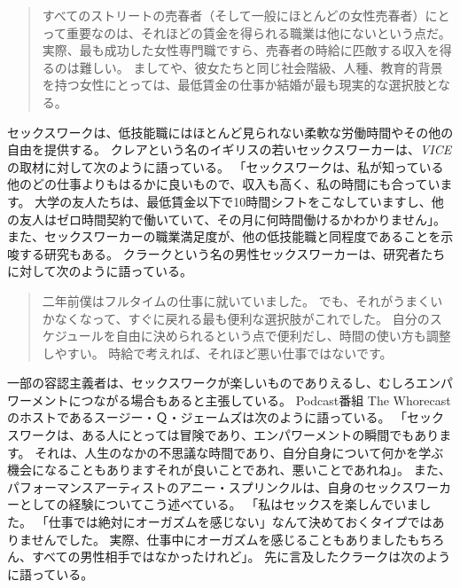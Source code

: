 \documentclass[paper=a4,book,openany]{jlreq} \usepackage{mystyle}
\begin{document}
\begin{quote}
すべてのストリートの売春者（そして一般にほとんどの女性売春者）にとって重要なのは、それほどの賃金を得られる職業は他にないという点だ。
実際、最も成功した女性専門職ですら、売春者の時給に匹敵する収入を得るのは難しい。
ましてや、彼女たちと同じ社会階級、人種、教育的背景を持つ女性にとっては、最低賃金の仕事か結婚が最も現実的な選択肢となる。
\citep[p.104]{bernstein99:_whats_wrong_prost}
\end{quote}

セックスワークは、低技能職にはほとんど見られない柔軟な労働時間やその他の自由を提供する。
クレアという名のイギリスの若いセックスワーカーは、\emph{VICE}の取材に対して次のように語っている。
「セックスワークは、私が知っている他のどの仕事よりもはるかに良いもので、収入も高く、私の時間にも合っています。
大学の友人たちは、最低賃金以下で10時間シフトをこなしていますし、他の友人はゼロ時間契約で働いていて、その月に何時間働けるかわかりません」\citep{mcintyre15:_what_its_like_pay_your}。
また、セックスワーカーの職業満足度が、他の低技能職と同程度であることを示唆する研究もある\citep{bilardi11:_job_satis_femal_sex_worker}。
クラークという名の男性セックスワーカーは、研究者たちに対して次のように語っている。

\begin{quote}
二年前僕はフルタイムの仕事に就いていました。
でも、それがうまくいかなくなって、すぐに戻れる最も便利な選択肢がこれでした。
自分のスケジュールを自由に決められるという点で便利だし、時間の使い方も調整しやすい。
時給で考えれば、それほど悪い仕事ではないです。
\citep[p.11]{curtis19:_we_are_naked_waitr_who_deliv_sex}
\end{quote}

一部の容認主義者は、セックスワークが楽しいものでありえるし、むしろエンパワーメントにつながる場合もあると主張している。
Podcast番組 The Whorecast のホストであるスージー・Ｑ・ジェームズは次のように語っている。
「セックスワークは、ある人にとっては冒険であり、エンパワーメントの瞬間でもあります。
それは、人生のなかの不思議な時間であり、自分自身について何かを学ぶ機会になることもあります{\DDASH}それが良いことであれ、悪いことであれね」\citep{richardson14:_is_sex_work_empow_enslav}。
また、パフォーマンスアーティストのアニー・スプリンクルは、自身のセックスワーカーとしての経験についてこう述べている。
「私はセックスを楽しんでいました。
「仕事では絶対にオーガズムを感じない」なんて決めておくタイプではありませんでした。
実際、仕事中にオーガズムを感じることもありました{\DDASH}もちろん、すべての男性相手ではなかったけれど」\citep[pp.42-43]{bell95:_whore_carniv}。
先に言及したクラークは次のように語っている。
\end{document}
